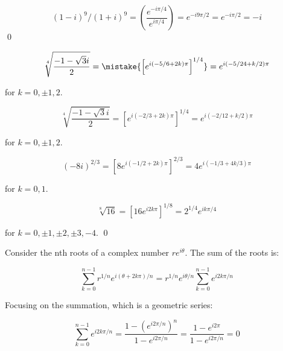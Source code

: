 \documentclass[12pt]{article}
\begin{document}

\begin{equation}
    (1 - i)^{9}/(1 + i)^{9} = \left( \frac{e^{-i \pi/4}}{e^{i \pi/4}} \right) = e^{-i 9\pi/2} = e^{-i \pi/2} = -i
\end{equation}
\qed




\begin{equation}
    \sqrt[4]{\frac{-1 - \sqrt{3}i}{2}} = \mistake{\left[ e^{i (-5/6 + 2k)\pi} \right]^{1/4}} = e^{i (-5/24 + k/2)\pi}
\end{equation}

for $k = 0, \pm1, 2$.

\begin{correction}
    \begin{equation*}
        \sqrt[4]{\frac{-1 - \sqrt{3}i}{2}} = \left[ e^{i (-2/3 + 2k)\pi} \right]^{1/4} = e^{i (-2/12 + k/2)\pi}
    \end{equation*}

    for $k = 0, \pm1, 2$.
\end{correction}


\begin{equation}
    (-8i)^{2/3} = \left[ 8 e^{i (-1/2 + 2k)\pi} \right]^{2/3} = 4 e^{i (-1/3 + 4k/3)\pi}
\end{equation}

for $k = 0, 1$.


\begin{equation}
    \sqrt[8]{16} = \left[ 16 e^{i 2k\pi} \right]^{1/8} = 2^{1/4} e^{i k\pi/4}
\end{equation}

for $k = 0, \pm1, \pm2, \pm3, -4$.
\qed



Consider the nth roots of a complex number $r e^{i\theta}$. The sum of the roots is:

\begin{equation}
    \sum_{k = 0}^{n-1} r^{1/n} e^{i (\theta + 2k\pi)/n} = r^{1/n} e^{i \theta/n} \sum_{k = 0}^{n-1} e^{i 2k\pi/n}
\end{equation}

Focusing on the summation, which is a geometric series:

\begin{equation}
    \sum_{k = 0}^{n-1} e^{i 2k\pi/n} = \frac{1 - \left( e^{i 2\pi/n} \right)^{n}}{1 - e^{i 2\pi/n}} = \frac{1 - e^{i 2\pi}}{1 - e^{i 2\pi/n}} = 0
\end{equation}
\end{document}
